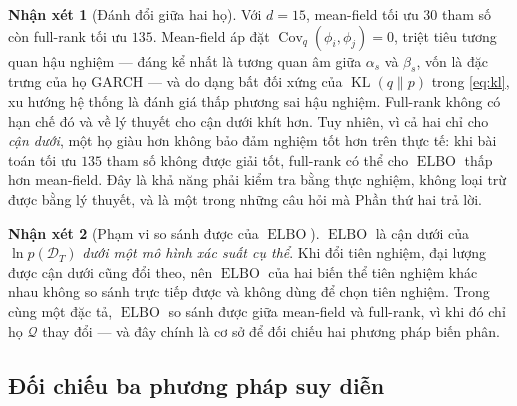 \documentclass[12pt,a4paper]{article}
\numberwithin{equation}{section}
\theoremstyle{definition}
\newtheorem{remark}{Nhận xét}[section]
\newcommand{\Cov}{\operatorname{Cov}}
\newcommand{\KL}{\operatorname{KL}}
\newcommand{\ELBO}{\operatorname{ELBO}}
\newcommand{\Data}{\mathcal{D}}
\begin{document}
\begin{remark}[Đánh đổi giữa hai họ]\label{rem:mf-vs-fr}
Với $d=15$, mean-field tối ưu $30$ tham số còn full-rank tối ưu $135$. Mean-field áp đặt
$\Cov_q(\phi_i,\phi_j)=0$, triệt tiêu tương quan hậu nghiệm --- đáng kể nhất là tương quan
âm giữa $\alpha_s$ và $\beta_s$, vốn là đặc trưng của họ GARCH --- và do dạng bất đối
xứng của $\KL(q\|p)$ trong \eqref{eq:kl}, xu hướng hệ thống là đánh giá thấp phương sai
hậu nghiệm. Full-rank không có hạn chế đó và về lý thuyết cho cận dưới khít hơn. Tuy
nhiên, vì cả hai chỉ cho \emph{cận dưới}, một họ giàu hơn không bảo đảm nghiệm tốt hơn
trên thực tế: khi bài toán tối ưu $135$ tham số không được giải tốt, full-rank có thể cho
$\ELBO$ thấp hơn mean-field. Đây là khả năng phải kiểm tra bằng thực nghiệm, không loại
trừ được bằng lý thuyết, và là một trong những câu hỏi mà Phần thứ hai trả lời.
\end{remark}

\begin{remark}[Phạm vi so sánh được của $\ELBO$]\label{rem:elbo-scope}
$\ELBO$ là cận dưới của $\ln p(\Data_T)$ \emph{dưới một mô hình xác suất cụ thể}. Khi đổi
tiên nghiệm, đại lượng được cận dưới cũng đổi theo, nên $\ELBO$ của hai biến thể tiên
nghiệm khác nhau không so sánh trực tiếp được và không dùng để chọn tiên nghiệm. Trong
cùng một đặc tả, $\ELBO$ so sánh được giữa mean-field và full-rank, vì khi đó chỉ họ
$\mathcal{Q}$ thay đổi --- và đây chính là cơ sở để đối chiếu hai phương pháp biến phân.
\end{remark}

\subsection{Đối chiếu ba phương pháp suy diễn}\label{subsec:comparison}
\end{document}
